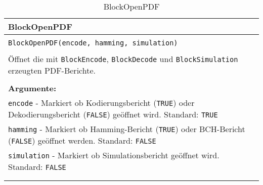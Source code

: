 \begin{longtable}{|p{\textwidth}|}
\hline
\rowcolor{lightblue}
BlockOpenPDF
\\
\hline
\\
\texttt{BlockOpenPDF(encode, hamming, simulation)}\\
\\
Öffnet die mit \texttt{BlockEncode}, \texttt{BlockDecode} und \texttt{BlockSimulation} erzeugten PDF-Berichte.\\
\\
\textbf{Argumente:}\\
\texttt{encode} - Markiert ob Kodierungsbericht (\texttt{TRUE}) oder Dekodierungsbericht (\texttt{FALSE}) geöffnet wird. Standard: \texttt{TRUE}\\
\texttt{hamming} - Markiert ob Hamming-Bericht (\texttt{TRUE}) oder BCH-Bericht (\texttt{FALSE}) geöffnet werden. Standard: \texttt{FALSE}\\
\texttt{simulation} - Markiert ob Simulationsbericht geöffnet wird. Standard: \texttt{FALSE}\\
\\
\hline
\caption{BlockOpenPDF}
\end{longtable}